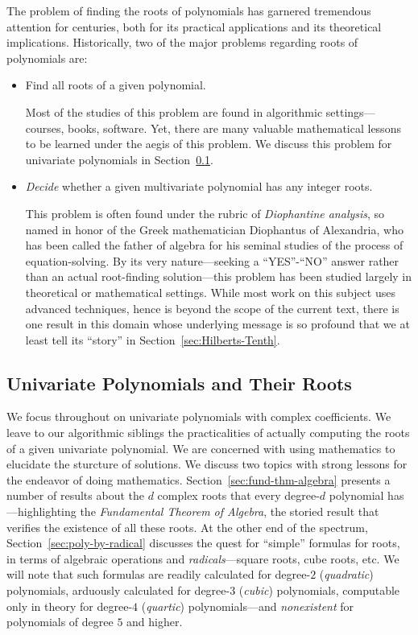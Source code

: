 The problem of finding the roots of polynomials has garnered
tremendous attention for centuries, both for its practical
applications and its theoretical implications.  Historically, two of
the major problems regarding roots of polynomials are:
\begin{itemize}
\item
Find all roots of a given polynomial.

Most of the studies of this problem are found in algorithmic
settings---courses, books, software.  Yet, there are many valuable
mathematical lessons to be learned under the aegis of this problem.
We discuss this problem for univariate polynomials in
Section~\ref{sec:univariate-polynomials}.

\item
{\em Decide} whether a given multivariate polynomial has any
integer roots.

This problem is often found under the rubric of {\it Diophantine
  analysis}, so named in honor of the Greek mathematician Diophantus
of Alexandria,  who has been called
the father of algebra for his seminal studies of the process of
equation-solving.  By its very nature---seeking a ``YES''-``NO''
answer rather than an actual root-finding solution---this problem has
been studied largely in theoretical or mathematical settings.  While
most work on this subject uses advanced techniques, hence is beyond
the scope of the current text, there is one result in this domain
whose underlying message is so profound that we at least tell its
``story'' in Section~\ref{sec:Hilberts-Tenth}.
\end{itemize}

\subsection{Univariate Polynomials and Their Roots}
\label{sec:univariate-polynomials}

We focus throughout on univariate polynomials with complex
coefficients.  We leave to our algorithmic siblings the practicalities
of actually computing the roots of a given univariate polynomial.  We
are concerned with using mathematics to elucidate the sturcture of
solutions.  We discuss two topics with strong lessons for the endeavor
of doing mathematics.  Section~\ref{sec:fund-thm-algebra} presents a
number of results about the $d$ complex roots that every degree-$d$
polynomial has---highlighting the {\it Fundamental Theorem of
  Algebra}, the storied result that verifies the existence of all
these roots.  At the other end of the spectrum,
Section~\ref{sec:poly-by-radical} discusses the quest for ``simple''
formulas for roots, in terms of algebraic operations and
 {\it radicals}---square roots, cube roots, etc.  We
will note that such formulas are readily calculated for degree-$2$
({\it quadratic}) polynomials,  arduously
calculated for degree-$3$ ({\it cubic}) 
polynomials, computable only in theory for degree-$4$ ({\it quartic})
 polynomials---and {\em nonexistent} for
polynomials of degree $5$ and higher.


